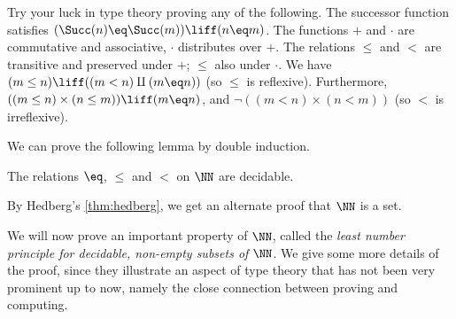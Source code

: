 \begin{xca}\label{xca:try-your-luck-N}
Try your luck in type theory proving any of the following.
The successor function satisfies $(\Succ(n) \eq \Succ(m))\liff(n \eq m)$.
The functions $+$ and $\cdot$ are commutative and associative,
$\cdot$ distributes over $+$.
The relations $\leq$ and $<$ are transitive and
preserved under $+$; $\leq$ also under $\cdot$.
We have $(m\leq n) \liff ((m<n)\amalg(m \eq n))$ (so $\leq$ is reflexive).
Furthermore, $((m\leq n)\times (n\leq m)) \liff (m \eq n)$,
and $\neg ((m<n)\times(n<m))$ (so $<$ is irreflexive).
\end{xca}

We can prove the following lemma by double induction.

\begin{lemma}\label{lem:dec-eq+order-N}
The relations $\eq$, $\leq$ and $<$ on $\NN$ are decidable.
\end{lemma}
By Hedberg's \cref{thm:hedberg}, we get an alternate proof that $\NN$ is a set.

We will now prove an important property of $\NN$, called the
\emph{least number principle for decidable, non-empty subsets of} $\NN$.
We give some more details of the proof, since they illustrate an aspect
of type theory that has not been very prominent up to now, namely
the close connection between proving and computing.

